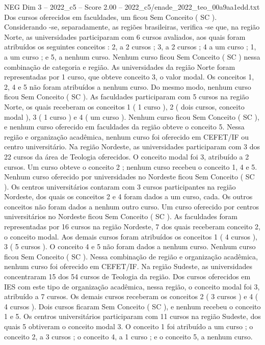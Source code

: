 \begin{textsample}{NEG Dim 3 – 2022\_c5 – Score 2.00 – 2022\_c5/enade\_2022\_teo\_00a9aa1edd.txt}
Dos cursos oferecidos em faculdades, um ficou Sem Conceito ( SC ).
Considerando -se, separadamente, as regiões brasileiras, verifica -se que, na região Norte, as universidades participaram com 6 cursos avaliados, aos quais foram atribuídos os seguintes conceitos : 2, a 2 cursos ; 3, a 2 cursos ; 4 a um curso ; 1, a um curso ; e 5, a nenhum curso.
Nenhum curso ficou Sem Conceito ( SC ) nessa combinação de categoria e região.
As universidades da região Norte foram representadas por 1 curso, que obteve conceito 3, o valor modal.
Os conceitos 1, 2, 4 e 5 não foram atribuídos a nenhum curso.
Do mesmo modo, nenhum curso ficou Sem Conceito ( SC ).
As faculdades participaram com 5 cursos na região Norte, os quais receberam os conceitos 1 ( 1 curso ), 2 ( dois cursos, conceito modal ), 3 ( 1 curso ) e 4 ( um curso ).
Nenhum curso ficou Sem Conceito ( SC ), e nenhum curso oferecido em faculdades da região obteve o conceito 5.
Nessa região e organização acadêmica, nenhum curso foi oferecido em CEFET/IF ou centro universitário.
Na região Nordeste, as universidades participaram com 3 dos 22 cursos da área de Teologia oferecidos.
O conceito modal foi 3, atribuído a 2 cursos.
Um curso obteve o conceito 2 ; nenhum curso recebeu o conceito 1, 4 e 5.
Nenhum curso oferecido por universidades no Nordeste ficou Sem Conceito ( SC ).
Os centros universitários contaram com 3 cursos participantes na região Nordeste, dos quais os conceitos 2 e 4 foram dados a um curso, cada.
Os outros conceitos não foram dados a nenhum outro curso.
Um curso oferecido por centros universitários no Nordeste ficou Sem Conceito ( SC ).
As faculdades foram representadas por 16 cursos na região Nordeste, 7 dos quais receberam conceito 2, o conceito modal.
Aos demais cursos foram atribuídos os conceitos 1 ( 4 cursos ), 3 ( 5 cursos ).
O conceito 4 e 5 não foram dados a nenhum curso.
Nenhum curso ficou Sem Conceito ( SC ).
Nessa combinação de região e organização acadêmica, nenhum curso foi oferecido em CEFET/IF.
Na região Sudeste, as universidades concentraram 15 dos 54 cursos de Teologia da região.
Dos cursos oferecidos em IES com este tipo de organização acadêmica, nessa região, o conceito modal foi 3, atribuído a 7 cursos.
Os demais cursos receberam os conceitos 2 ( 3 cursos ) e 4 ( 4 cursos ).
Dois cursos ficaram Sem Conceito ( SC ), e nenhum recebeu o conceito 1 e 5.
Os centros universitários participaram com 11 cursos na região Sudeste, dos quais 5 obtiveram o conceito modal 3.
O conceito 1 foi atribuído a um curso ; o conceito 2, a 3 cursos ; o conceito 4, a 1 curso ; e o conceito 5, a nenhum curso.

\end{textsample}
